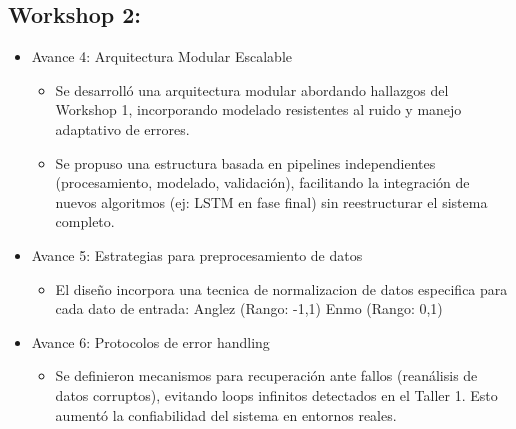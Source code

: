 \documentclass[conference]{IEEEtran}
\begin{document}
\subsection{Workshop 2:}
\begin{itemize}
\item Avance 4: Arquitectura Modular Escalable   
    \begin{itemize}
    \item Se desarrolló una arquitectura modular abordando hallazgos del Workshop 1, incorporando modelado resistentes al ruido y manejo adaptativo de errores.
    \item Se propuso una estructura basada en pipelines independientes (procesamiento, modelado, validación), facilitando la integración de nuevos algoritmos (ej: LSTM en fase final) sin reestructurar el sistema completo.
    \end{itemize}
\item Avance 5: Estrategias para preprocesamiento de datos
    \begin{itemize}
    \item El diseño incorpora una tecnica de normalizacion de datos especifica para cada dato de entrada: Anglez (Rango: -1,1) Enmo (Rango: 0,1)
    \end{itemize}
\item Avance 6: Protocolos de error handling
    \begin{itemize}
    \item Se definieron mecanismos para recuperación ante fallos (reanálisis de datos corruptos), evitando loops infinitos detectados en el Taller 1. Esto aumentó la confiabilidad del sistema en entornos reales.
    \end{itemize}
\end{itemize}
\end{document}
